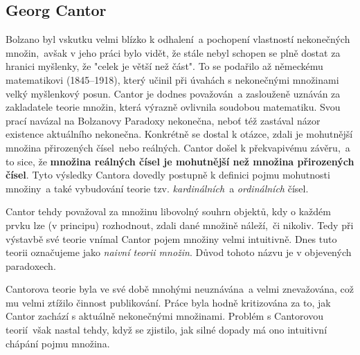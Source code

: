 \subsection{Georg Cantor}\label{subsec:cantor}
Bolzano byl vskutku velmi blízko k odhalení~a pochopení vlastností nekonečných množin,~avšak v jeho práci bylo vidět, že stále nebyl schopen se plně dostat za hranici myšlenky, že "celek je větší než část". To se podařilo až německému matematikovi  (1845--1918), který učinil při úvahách s nekonečnými množinami velký myšlenkový posun. Cantor je dodnes považován~a zaslouženě uznáván za zakladatele teorie množin, která výrazně ovlivnila soudobou matematiku. Svou prací navázal na Bolzanovy Paradoxy nekonečna, neboť též zastával názor existence aktuálního nekonečna. Konkrétně se dostal k otázce, zdali je mohutnější množina přirozených čísel~nebo reálných. Cantor došel k překvapivému závěru,~a to sice, že \textbf{množina reálných čísel je mohutnější než množina přirozených čísel}. Tyto výsledky Cantora dovedly postupně k definici pojmu mohutnosti množiny~a také vybudování teorie tzv. \emph{kardinálních}~a \emph{ordinálních} čísel.\par
Cantor tehdy považoval za množinu libovolný souhrn objektů, kdy o každém prvku lze (v principu) rozhodnout, zdali dané množině náleží,~či nikoliv. Tedy při výstavbě své teorie vnímal Cantor pojem množiny velmi intuitivně. Dnes tuto teorii označujeme jako \emph{naivní teorii množin}. Důvod tohoto názvu je v objevených paradoxech.\par
Cantorova teorie byla ve své době mnohými neuznávána~a velmi znevažována, což mu velmi ztížilo činnost publikování. Práce byla hodně kritizována za to, jak Cantor zachází s aktuálně nekonečnými množinami. Problém s Cantorovou teorií~však nastal tehdy, když se zjistilo, jak silné dopady má ono intuitivní chápání pojmu množina.

